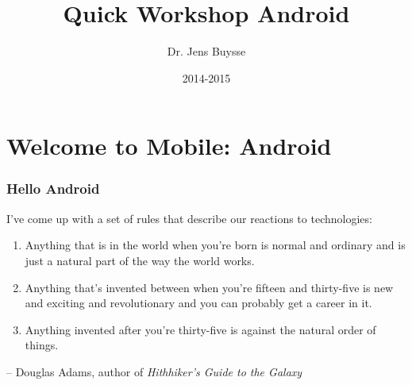 \documentclass{beamer}
\title[Intro]{Quick Workshop Android}
\author{Dr. Jens Buysse }
\date{2014-2015}
\begin{document}

\HoGentLogo

\titleframe


\section{Welcome to Mobile: Android}
\sectionframe

\begin{frame}
	\frametitle{Hello Android}
	I've come up with a set of rules that describe our reactions to
technologies:
\begin{enumerate}
	\item Anything that is in the world when you're born is normal and ordinary and is just a natural part of the way the world works.
	\item Anything that's invented between when you're fifteen and thirty-five is new and exciting and revolutionary and you can probably get a career in it.
	\item Anything invented after you're thirty-five is against the natural order of things.
\end{enumerate}
\begin{flushright}

\end{flushright}
-- Douglas Adams, author of \textsl{Hithhiker's Guide to the Galaxy}
\end{frame}
\end{document}
